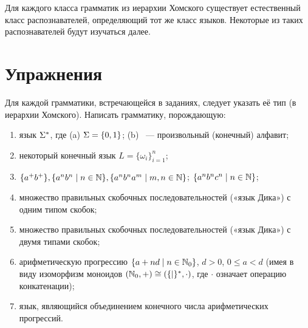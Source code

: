 Для каждого класса грамматик из иерархии Хомского существует
естественный класс распознавателей, определяющий тот же класс языков.
Некоторые из таких распознавателей будут изучаться далее.

\section{Упражнения}
\label{Chapter1Exs}

Для каждой грамматики, встречающейся в заданиях, следует указать её тип (в
иерархии Хомского). Написать грамматику, порождающую:
\begin{enumerate}
 \item язык $\Sigma^{\ast}$, где (a) $\Sigma = \{0, 1\}$; (b) \Sig{}~— произвольный
 (конечный) алфавит;

 \item некоторый конечный язык $L = \{\omega_i\}^n_{i=1}$;

 \item $\{a^{+}b^{+}\}, \{a^nb^n \mid n \in \mathbb N\}, \{a^nb^na^m \mid m, n \in
     \mathbb N\}$; $\{ a^nb^nc^n \mid n \in \mathbb N \}$;

 \item множество правильных скобочных последовательностей («язык Дика») с
     одним типом скобок;
 \item множество правильных скобочных последовательностей («язык Дика») с
     двумя типами скобок;
  \item арифметическую прогрессию $\{a + nd \mid n \in \mathbb N_0\}$, $d > 0$, $0
    \leqslant a < d$ (имея в виду изоморфизм моноидов $(\mathbb N_0, +) \cong
    (\{|\}^{\ast}, {\cdot})$, где ${\cdot}$ означает операцию конкатенации);
   \item язык, являющийся объединением конечного числа арифметических прогрессий.
\end{enumerate}